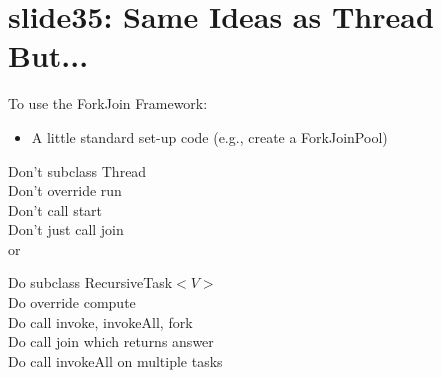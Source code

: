 \documentclass[12pt, a4paper]{book}
\begin{document}
\section{slide35: Same Ideas as Thread But...}
To use the ForkJoin Framework:
\begin{itemize}
    \item A little standard set-up code (e.g., create a ForkJoinPool)
\end{itemize}
\begin{minipage}{0.5\linewidth}
    Don't subclass Thread
    \\ Don't override run
    \\ Don't call start
    \\ Don't just call join
    \\ or
\end{minipage}
\begin{minipage}{0.5\linewidth}
    Do subclass RecursiveTask$<V>$\\
    Do override compute\\
    Do call invoke, invokeAll, fork\\
    Do call join which returns answer\\[0.5in]

    Do call invokeAll on multiple tasks\\
\end{minipage}

















\end{document}
